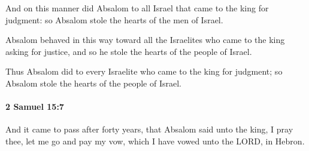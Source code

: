 			\begin{versebox}
					\item[BHS] 
					\item[ASV] And on this manner did Absalom to all Israel that came to the king for judgment: so Absalom stole the hearts of the men of Israel.
					\item[NIV] Absalom behaved in this way toward all the Israelites who came to the king asking for justice, and so he stole the hearts of the people of Israel.
					\item[NRSV] Thus Absalom did to every Israelite who came to the king for judgment; so Absalom stole the hearts of the people of Israel.
			\end{versebox}

		\paragraph{2 Samuel 15:7} %
			\label{2SAMUEL-15-7}

			And it came to pass after forty years, that Absalom said unto the king, I pray thee, let me go and pay my vow, which I have vowed unto the LORD, in Hebron.

